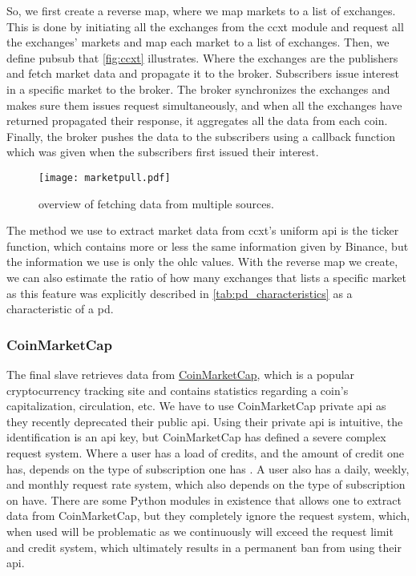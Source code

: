 So, we first create a reverse map, where we map markets to a list of exchanges. This is done by initiating all the exchanges from the ccxt module and request all the exchanges' markets and map each market to a list of exchanges. Then, we define \ac{pubsub} that \autoref{fig:ccxt} illustrates. Where the exchanges are the publishers and fetch market data and propagate it to the broker. Subscribers issue interest in a specific market to the broker. The broker synchronizes the exchanges and makes sure them issues request simultaneously, and when all the exchanges have returned propagated their response, it aggregates all the data from each coin. Finally, the broker pushes the data to the subscribers using a callback function which was given when the subscribers first issued their interest.

\begin{figure}
    \centering
    \texttt{[image: marketpull.pdf]}
    \caption[\project's Publish/Subscribe system]{overview of fetching data from multiple sources.}
    \label{fig:ccxt}
\end{figure}

The method we use to extract market data from ccxt's uniform \ac{api} is the ticker function, which contains more or less the same information given by Binance, but the information we use is only the \ac{ohlc} values. With the reverse map we create, we can also estimate the ratio of how many exchanges that lists a specific market as this feature was explicitly described in \autoref{tab:pd_characteristics} as a characteristic of a \ac{pd}.

\subsubsection{CoinMarketCap}
The final slave retrieves data from \href{https://coinmarketcap.com/}{CoinMarketCap}, which is a popular cryptocurrency tracking site and contains statistics regarding a coin's capitalization, circulation, etc. We have to use CoinMarketCap private \ac{api} as they recently deprecated their public \ac{api}. Using their private \ac{api} is intuitive, the identification is an \ac{api} key, but CoinMarketCap has defined a severe complex request system. Where a user has a load of credits, and the amount of credit one has, depends on the type of subscription one has . A user also has a daily, weekly, and monthly request rate system, which also depends on the type of subscription on have. There are some Python modules in existence that allows one to extract data from CoinMarketCap, but they completely ignore the request system, which, when used will be problematic as we continuously will exceed the request limit and credit system, which ultimately results in a permanent ban from using their \ac{api}.

